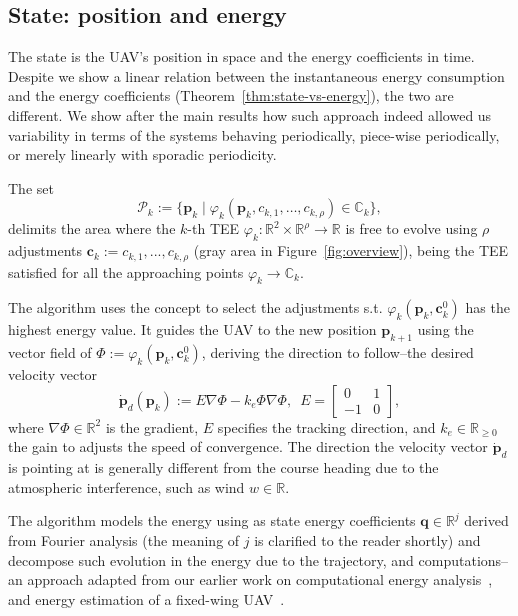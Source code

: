 \documentclass[letterpaper,10pt,conference]{ieeeconf}
\theoremstyle{definition}
\begin{document}
\subsection{State: position and energy}
\label{sec:model}

The state is the UAV's position in space and the energy coefficients in time. Despite we show a linear relation between the instantaneous energy consumption and the energy coefficients (Theorem~\ref{thm:state-vs-energy}), the two are different. We show after the main results how such approach indeed allowed us variability in terms of the systems behaving periodically, piece-wise periodically, or merely linearly with sporadic periodicity.

The set
\begin{equation}\label{eq:area}
  \mathcal{P}_k:=\{\mathbf{p}_k\mid\varphi_k(\mathbf{p}_k,c_{k,1},\dots,c_{k,\rho})\in\mathbb{C}_k\},
\end{equation}
delimits the area where the $k$-th TEE $\varphi_k:\mathbb{R}^2\times\mathbb{R}^{\rho}\rightarrow\mathbb{R}$ is free to evolve using $\rho$ adjustments $\mathbf{c}_k:=c_{k,1},...,c_{k,\rho}$ (gray area in Figure~\ref{fig:overview}), being the TEE satisfied for all the approaching points $\varphi_k\rightarrow\mathbb{C}_k$.

The algorithm uses the concept to select the adjustments s.t. $\varphi_k(\mathbf{p}_k,\mathbf{c}_k^0)$ has the highest energy value. It guides the UAV to the new position $\mathbf{p}_{k+1}$ using the vector field of $\varPhi:=\varphi_k(\mathbf{p}_k,\mathbf{c}_k^0)$, deriving the direction to follow--the desired velocity vector
\begin{equation}\label{eq:pd}
  \dot{\mathbf{p}}_d(\mathbf{p}_k):=E\nabla\varPhi-k_e\varPhi\nabla\varPhi,\,\,\,E=\begin{bmatrix}
    0&1\\-1&0
  \end{bmatrix},
\end{equation}
where $\nabla\varPhi\in\mathbb{R}^2$ is the gradient, $E$ specifies the tracking direction, and $k_e\in\mathbb{R}_{\geq 0}$ the gain to adjusts the speed of convergence. The direction the velocity vector $\dot{\mathbf{p}}_d$ is pointing at is generally different from the course heading due to the atmospheric interference, such as wind $w\in\mathbb{R}$.

The algorithm models the energy using as state energy coefficients $\mathbf{q}\in\mathbb{R}^j$ derived from Fourier analysis (the meaning of $j$ is clarified to the reader shortly) and decompose such evolution in the energy due to the trajectory, and computations--an approach adapted from our earlier work on computational energy analysis~\cite{seewald2019coarse, seewald2019component}, and energy estimation of a fixed-wing UAV~\cite{seewald2020mechanical}. 
\end{document}
